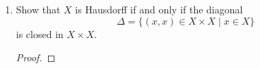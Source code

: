 \documentclass[12pt]{article}
\theoremstyle{definition}
\begin{document}
\begin{enumerate}
\begin{enumerate}
\begin{proof}
                \end{proof}
        \end{enumerate}
        \item Show that $X$ is Hausdorff if and only if the diagonal
            \begin{equation*}
                \Delta=\{(x,x)\in X\times X\mid x\in X\}
            \end{equation*}
            is closed in $X\times X$.
            \begin{proof}
                
            \end{proof}
    \end{enumerate}
\end{document}
